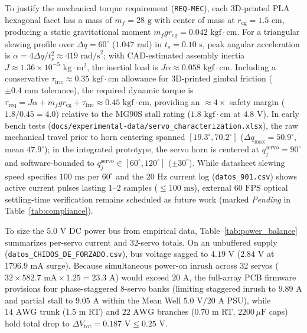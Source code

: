 \documentclass[lettersize,journal]{IEEEtran}
\begin{document}
	To justify the mechanical torque requirement (\texttt{REQ-MEC}), each 3D-printed PLA hexagonal facet has a mass of $m_f = 28\text{ g}$ with center of mass at $r_{\text{cg}} = 1.5\text{ cm}$, producing a static gravitational moment $m_f g r_{\text{cg}} = 0.042\text{ kgf}\cdot\text{cm}$. For a triangular slewing profile over $\Delta q = 60^\circ$ ($1.047\text{ rad}$) in $t_s = 0.10\text{ s}$, peak angular acceleration is $\alpha = 4\Delta q / t_s^2 \approx 419\text{ rad/s}^2$; with CAD-estimated assembly inertia $J \approx 1.36\times 10^{-5}\text{ kg}\cdot\text{m}^2$, the inertial load is $J\alpha \approx 0.058\text{ kgf}\cdot\text{cm}$. Including a conservative $\tau_{\text{fric}} \approx 0.35\text{ kgf}\cdot\text{cm}$ allowance for 3D-printed gimbal friction ($\pm 0.4\text{ mm}$ tolerance), the required dynamic torque is $\tau_{\text{req}} = J\alpha + m_f g r_{\text{cg}} + \tau_{\text{fric}} \approx 0.45\text{ kgf}\cdot\text{cm}$, providing an $\approx 4\times$ safety margin ($1.8/0.45 = 4.0$) relative to the MG90S stall rating ($1.8\text{ kgf}\cdot\text{cm}$ at $4.8\text{ V}$). In early bench tests (\texttt{docs/experimental-data/servo\_characterization.xlsx}), the raw mechanical travel prior to horn centering spanned $[19.3^\circ, 70.2^\circ]$ ($\Delta q_{\max} = 50.9^\circ$, mean $47.9^\circ$); in the integrated prototype, the servo horn is centered at $q_j^{\text{servo}} = 90^\circ$ and software-bounded to $q_j^{\text{servo}} \in [60^\circ, 120^\circ]$ ($\pm 30^\circ$). While datasheet slewing speed specifies $100\text{ ms}$ per $60^\circ$ and the $20\text{ Hz}$ current log (\texttt{datos\_901.csv}) shows active current pulses lasting $1\text{--}2$ samples ($\le 100\text{ ms}$), external $60\text{ FPS}$ optical settling-time verification remains scheduled as future work (marked \textit{Pending} in Table~\ref{tab:compliance}).
	
	To size the $5.0\text{ V}$ DC power bus from empirical data, Table~\ref{tab:power_balance} summarizes per-servo current and 32-servo totals. On an unbuffered supply (\texttt{datos\_CHIDOS\_DE\_FORZADO.csv}), bus voltage sagged to $4.19\text{ V}$ ($2.84\text{ V}$ at $1796.9\text{ mA}$ surge). Because simultaneous power-on inrush across 32 servos ($32 \times 582.7\text{ mA} \times 1.25 = 23.3\text{ A}$) would exceed $20\text{ A}$, the full-array PCB firmware provisions four phase-staggered 8-servo banks (limiting staggered inrush to $9.89\text{ A}$ and partial stall to $9.05\text{ A}$ within the Mean Well $5.0\text{ V}/20\text{ A}$ PSU), while $14\text{ AWG}$ trunk ($1.5\text{ m}$ RT) and $22\text{ AWG}$ branches ($0.70\text{ m}$ RT, $2200\,\mu\text{F}$ caps) hold total drop to $\Delta V_{\text{tot}} = 0.187\text{ V} \le 0.25\text{ V}$.
	
\end{document}
